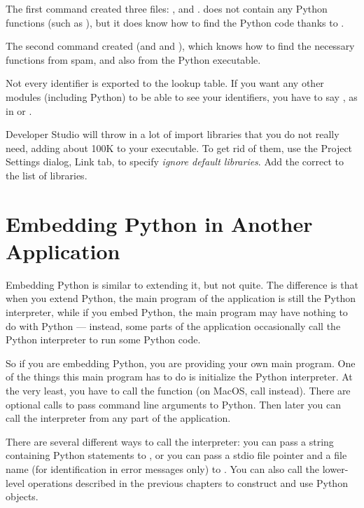 \documentclass{manual}
\begin{document}
The first command created three files: ,
 and .   does not contain
any Python functions (such as ), but it
does know how to find the Python code thanks to .

The second command created  (and  and
), which knows how to find the necessary functions from
spam, and also from the Python executable.

Not every identifier is exported to the lookup table.  If you want any
other modules (including Python) to be able to see your identifiers,
you have to say , as in  or .

Developer Studio will throw in a lot of import libraries that you do
not really need, adding about 100K to your executable.  To get rid of
them, use the Project Settings dialog, Link tab, to specify
\emph{ignore default libraries}.  Add the correct
 to the list of libraries.


\chapter{Embedding Python in Another Application
         \label{embedding}}

Embedding Python is similar to extending it, but not quite.  The
difference is that when you extend Python, the main program of the
application is still the Python interpreter, while if you embed
Python, the main program may have nothing to do with Python ---
instead, some parts of the application occasionally call the Python
interpreter to run some Python code.

So if you are embedding Python, you are providing your own main
program.  One of the things this main program has to do is initialize
the Python interpreter.  At the very least, you have to call the
function  (on MacOS, call
 instead).  There are optional calls to
pass command line arguments to Python.  Then later you can call the
interpreter from any part of the application.

There are several different ways to call the interpreter: you can pass
a string containing Python statements to
, or you can pass a stdio file pointer
and a file name (for identification in error messages only) to
.  You can also call the lower-level
operations described in the previous chapters to construct and use
Python objects.
\end{document}
